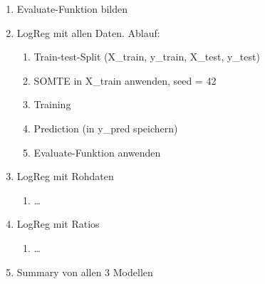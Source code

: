 \documentclass[a4paper, nobind]{templates/ociamthesis}
\providecommand{\tightlist}{%
  \setlength{\itemsep}{0pt}\setlength{\parskip}{0pt}}
\begin{document}
\begin{enumerate}
\def\labelenumi{\arabic{enumi}.}
\tightlist
\item
  Evaluate-Funktion bilden
\item
  LogReg mit allen Daten. Ablauf:

  \begin{enumerate}
  \def\labelenumii{\arabic{enumii}.}
  \tightlist
  \item
    Train-test-Split (X\_train, y\_train, X\_test, y\_test)
  \item
    SOMTE in X\_train anwenden, seed = 42
  \item
    Training
  \item
    Prediction (in y\_pred speichern)
  \item
    Evaluate-Funktion anwenden
  \end{enumerate}
\item
  LogReg mit Rohdaten

  \begin{enumerate}
  \def\labelenumii{\arabic{enumii}.}
  \tightlist
  \item
    \ldots{}
  \end{enumerate}
\item
  LogReg mit Ratios

  \begin{enumerate}
  \def\labelenumii{\arabic{enumii}.}
  \tightlist
  \item
    \ldots{}
  \end{enumerate}
\item
  Summary von allen 3 Modellen
\end{enumerate}
\end{document}
